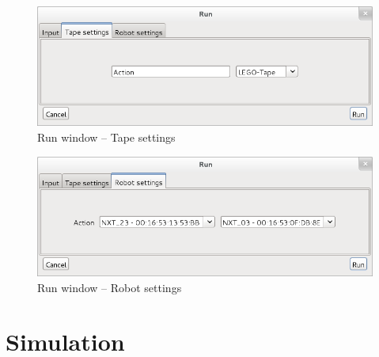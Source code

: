 \documentclass[%
  a4paper,%
  11pt,%
  blue,%
  hyperref	%
  ]{tubsartcl}
\begin{document}
\begin{figure}[!htb]
\begin{center}
\includegraphics[scale=0.5]{graphics_gui/run_window_tape_settings.png}
\end{center}
\caption{Run window -- Tape settings}
\label{pic:run_window_tape_settings}
\end{figure}


\begin{figure}[!htb]
\begin{center}
\includegraphics[scale=0.5]{graphics_gui/run_window_robot_settings.png}
\end{center}
\caption{Run window -- Robot settings}
\label{pic:run_window_robot_settings}
\end{figure}
 
\section{Simulation}
\end{document}
